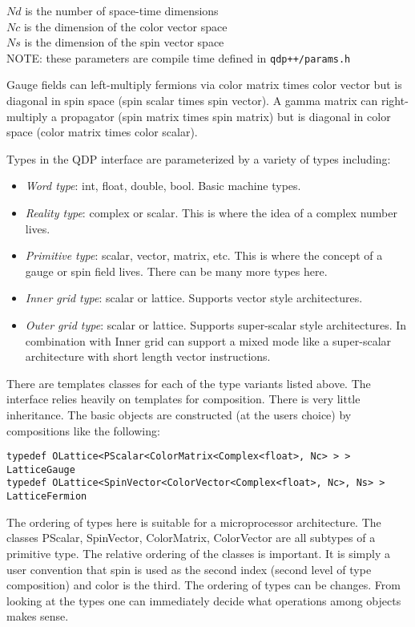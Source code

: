 \documentclass[12pt,letterpaper]{article}
\begin{document}
\noindent
$Nd$ is the number of space-time dimensions\\
\noindent
$Nc$ is the dimension of the color vector space\\
\noindent
$Ns$ is the dimension of the spin vector space\\
\noindent
NOTE: these parameters are compile time defined in  {\tt qdp++/params.h}

Gauge fields can left-multiply fermions via color matrix times color
vector but is diagonal in spin space (spin scalar times spin vector).
A gamma matrix can right-multiply a propagator (spin matrix times
spin matrix) but is diagonal in color space (color matrix times color
scalar).

Types in the QDP interface are parameterized by a variety of types including:
\begin{itemize}
\item {\em Word type}: 
  int, float, double, bool. Basic machine types.
\item {\em Reality type}: 
  complex or scalar. This is where the idea of a complex number
  lives.
\item {\em Primitive type}: 
  scalar, vector, matrix, etc. This is where the concept of a gauge or
  spin field lives. There can be many more types here.
\item {\em Inner grid type}: 
  scalar or lattice. Supports vector style architectures.
\item {\em Outer grid type}:
  scalar or lattice. Supports super-scalar style architectures. In
  combination with Inner grid can support a mixed mode like a
  super-scalar architecture with short length vector instructions.
\end{itemize}

There are templates classes for each of the type variants listed
above. The interface relies heavily on templates for
composition. There is very little inheritance. The basic objects are
constructed (at the users choice) by compositions like the following:

\begin{verbatim}
typedef OLattice<PScalar<ColorMatrix<Complex<float>, Nc> > > LatticeGauge
typedef OLattice<SpinVector<ColorVector<Complex<float>, Nc>, Ns> > LatticeFermion
\end{verbatim}
%
The ordering of types here is suitable for a microprocessor
architecture.  The classes PScalar, SpinVector, ColorMatrix,
ColorVector are all subtypes of a primitive type. The relative
ordering of the classes is important. It is simply a user convention
that spin is used as the second index (second level of type
composition) and color is the third. The ordering of types can be
changes. From looking at the types one can immediately decide what
operations among objects makes sense.
\end{document}

